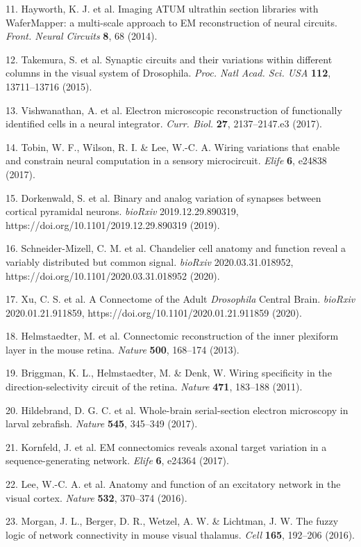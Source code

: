 \documentclass{article}
\begin{document}
\begin{hangpars}
11. Hayworth, K. J. et al. Imaging ATUM ultrathin section libraries with WaferMapper: a multi-scale approach to EM reconstruction of neural circuits. \emph{Front. Neural Circuits} \textbf{8}, 68 (2014).

12. Takemura, S. et al. Synaptic circuits and their variations within different columns in the visual system of Drosophila. \emph{Proc. Natl Acad. Sci. USA} \textbf{112}, 13711–13716 (2015).

13. Vishwanathan, A. et al. Electron microscopic reconstruction of functionally identified cells in a neural integrator. \emph{Curr. Biol.} \textbf{27}, 2137–2147.e3 (2017).

14. Tobin, W. F., Wilson, R. I. \& Lee, W.-C. A. Wiring variations that enable and constrain neural computation in a sensory microcircuit. \emph{Elife} \textbf{6}, e24838 (2017).

15. Dorkenwald, S. et al. Binary and analog variation of synapses between cortical pyramidal neurons. \emph{bioRxiv} 2019.12.29.890319, https://doi.org/10.1101/2019.12.29.890319 (2019).

16. Schneider-Mizell, C. M. et al. Chandelier cell anatomy and function reveal a variably distributed but common signal. \emph{bioRxiv} 2020.03.31.018952, https://doi.org/10.1101/2020.03.31.018952 (2020).

17. Xu, C. S. et al. A Connectome of the Adult \emph{Drosophila} Central Brain. \emph{bioRxiv} 2020.01.21.911859, https://doi.org/10.1101/2020.01.21.911859 (2020).

18. Helmstaedter, M. et al. Connectomic reconstruction of the inner plexiform layer in the mouse retina. \emph{Nature} \textbf{500}, 168–174 (2013).

19. Briggman, K. L., Helmstaedter, M. \& Denk, W. Wiring specificity in the direction-selectivity circuit of the retina. \emph{Nature} \textbf{471}, 183–188 (2011).

20. Hildebrand, D. G. C. et al. Whole-brain serial-section electron microscopy in larval zebrafish. \emph{Nature} \textbf{545}, 345–349 (2017).

21. Kornfeld, J. et al. EM connectomics reveals axonal target variation in a sequence-generating network. \emph{Elife} \textbf{6}, e24364 (2017).

22. Lee, W.-C. A. et al. Anatomy and function of an excitatory network in the visual cortex. \emph{Nature} \textbf{532}, 370–374 (2016).

23. Morgan, J. L., Berger, D. R., Wetzel, A. W. \& Lichtman, J. W. The fuzzy logic of network connectivity in mouse visual thalamus. \emph{Cell} \textbf{165}, 192–206 (2016).


\end{hangpars}
\end{document}
